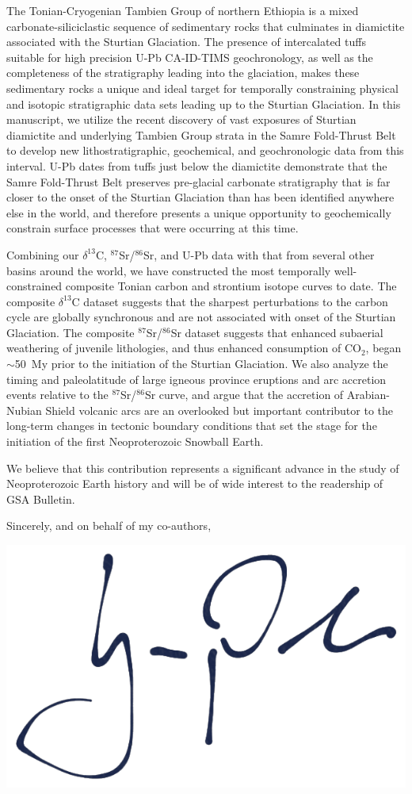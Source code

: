 \documentclass[11pt]{letter}
\newcommand{\dC}{$\delta^{13}$C\xspace}
\newcommand{\SrSr}{$^{87}$Sr/$^{86}$Sr\xspace}
\begin{document}
The Tonian-Cryogenian Tambien Group of northern Ethiopia is a mixed carbonate-siliciclastic sequence of sedimentary rocks that culminates in diamictite associated with the Sturtian Glaciation. The presence of intercalated tuffs suitable for high precision U-Pb CA-ID-TIMS geochronology, as well as the completeness of the stratigraphy leading into the glaciation, makes these sedimentary rocks a unique and ideal target for temporally constraining physical and isotopic stratigraphic data sets leading up to the Sturtian Glaciation. In this manuscript, we utilize the recent discovery of vast exposures of Sturtian diamictite and underlying Tambien Group strata in the Samre Fold-Thrust Belt to develop new lithostratigraphic, geochemical, and geochronologic data from this interval. U-Pb dates from tuffs just below the diamictite demonstrate that the Samre Fold-Thrust Belt preserves pre-glacial carbonate stratigraphy that is far closer to the onset of the Sturtian Glaciation than has been identified anywhere else in the world, and therefore presents a unique opportunity to geochemically constrain surface processes that were occurring at this time.

Combining our \dC, \SrSr, and U-Pb data with that from several other basins around the world, we have constructed the most temporally well-constrained composite Tonian carbon and strontium isotope curves to date. The composite \dC dataset suggests that the sharpest perturbations to the carbon cycle are globally synchronous and are not associated with onset of the Sturtian Glaciation. The composite \SrSr dataset suggests that enhanced subaerial weathering of juvenile lithologies, and thus enhanced consumption of CO$_{2}$, began $\sim$50~My prior to the initiation of the Sturtian Glaciation. We also analyze the timing and paleolatitude of large igneous province eruptions and arc accretion events relative to the \SrSr curve, and argue that the accretion of Arabian-Nubian Shield volcanic arcs are an overlooked but important contributor to the long-term changes in tectonic boundary conditions that set the stage for the initiation of the first Neoproterozoic Snowball Earth.

We believe that this contribution represents a significant advance in the study of Neoproterozoic Earth history and will be of wide interest to the readership of GSA Bulletin.

Sincerely, and on behalf of my co-authors,

\vspace{0.2cm}
\includegraphics[width=0.25\linewidth]{Figures/signature.pdf}
\vspace{0.2cm}
\end{document}
